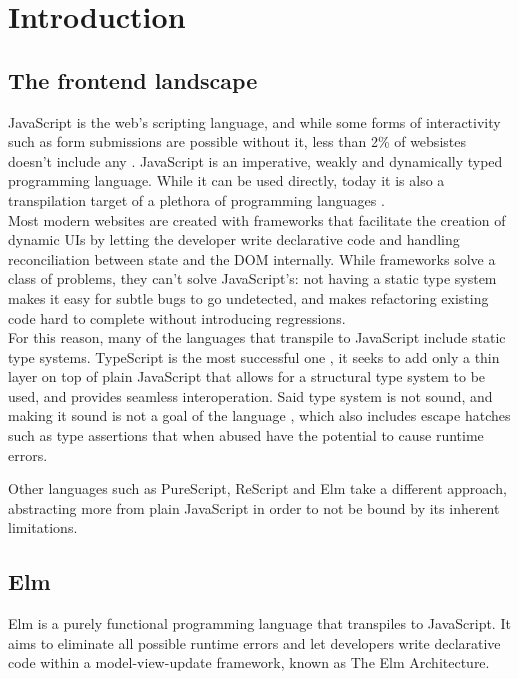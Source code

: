 \chapter{Introduction}
\setcounter{page}{1}

\section{The frontend landscape}
JavaScript is the web's scripting language, and while some forms of interactivity such as form submissions are possible without it, less than 2\% of websistes doesn't include any \cite{noauthor_usage_nodate}. JavaScript is an imperative, weakly and dynamically typed programming language. While it can be used directly, today it is also a transpilation target of a plethora of programming languages \cite{noauthor_list_nodate}.\\

Most modern websites are created with frameworks that facilitate the creation of dynamic UIs by letting the developer write declarative code and handling reconciliation between state and the DOM internally. While frameworks solve a class of problems, they can't solve JavaScript's: not having a static type system makes it easy for subtle bugs to go undetected, and makes refactoring existing code hard to complete without introducing regressions.\\

For this reason, many of the languages that transpile to JavaScript include static type systems. TypeScript is the most successful one \cite{noauthor_most_nodate}, it seeks to add only a thin layer on top of plain JavaScript that allows for a structural type system to be used, and provides seamless interoperation. Said type system is not sound, and making it sound is not a goal of the language \cite{noauthor_typescript_nodate}, which also includes escape hatches such as type assertions that when abused have the potential to cause runtime errors.

Other languages such as PureScript, ReScript and Elm take a different approach, abstracting more from plain JavaScript in order to not be bound by its inherent limitations.

\section{Elm}
Elm is a purely functional programming language that transpiles to JavaScript. It aims to eliminate all possible runtime errors and let developers write declarative code within a model-view-update framework, known as The Elm Architecture.

